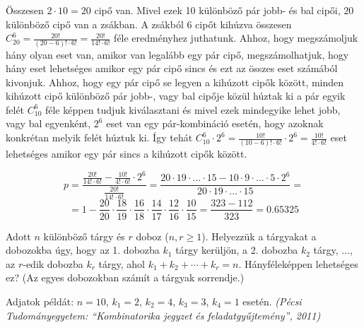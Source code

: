 \begin{solution}
Összesen $2\cdot10=20$ cipő van. Mivel ezek 10 különböző pár jobb-
és bal cipői, $20$ különböző cipő van a zsákban. A zsákból $6$ cipőt
kihúzva összesen $C_{20}^{6}=\frac{20!}{(20-6)!\cdot6!}=\frac{20!}{14!\cdot6!}$
féle eredményhez juthatunk. Ahhoz, hogy megszámoljuk hány olyan eset
van, amikor van legalább egy pár cipő, megszámolhatjuk, hogy hány
eset lehetséges amikor egy pár cipő sincs és ezt az összes eset számából
kivonjuk. Ahhoz, hogy egy pár cipő se legyen a kihúzott cipők között,
minden kihúzott cipő különböző pár jobb-, vagy bal cipője közül húztak
ki a pár egyik felét $C_{10}^{6}$ féle képpen tudjuk kiválasztani
és mivel ezek mindegyike lehet jobb, vagy bal egyenként, $2^{6}$
eset van egy pár-kombináció esetén, hogy azoknak konkrétan melyik
felét húztuk ki. Így tehát $C_{10}^{6}\cdot2^{6}=\frac{10!}{(10-6)!\cdot6!}\cdot2^{6}=\frac{10!}{4!\cdot6!}$
eset lehetséges amikor egy pár sincs a kihúzott cipők között.

\[
p=\frac{\frac{20!}{14!\cdot6!}-\frac{10!}{4!\cdot6!}\cdot2^{6}}{\frac{20!}{14!\cdot6!}}=\frac{20\cdot19\cdot...\cdot15-10\cdot9\cdot...\cdot5\cdot2^{6}}{20\cdot19\cdot...\cdot15}=
\]
\[
=1-\frac{20}{20}\cdot\frac{18}{19}\cdot\frac{16}{18}\cdot\frac{14}{17}\cdot\frac{12}{16}\cdot\frac{10}{15}=\frac{323-112}{323}=0.65325
\]
\end{solution}
\begin{extraproblem}
Adott $n$ különböző tárgy és $r$ doboz ($n,r\geq1$). Helyezzük
a tárgyakat a dobozokba úgy, hogy az 1. dobozba $k_{1}$ tárgy kerüljön,
a 2. dobozba $k_{2}$ tárgy, ..., az $r$-edik dobozba $k_{r}$ tárgy,
ahol $k_{1}+k_{2}+\cdots+k_{r}=n$. Hányféleképpen lehetséges ez?
(Az egyes dobozokban számít a tárgyak sorrendje.)
\end{extraproblem}
Adjatok példát: $n=10$, $k_{1}=2$, $k_{2}=4$, $k_{3}=3$, $k_{4}=1$
esetén.\emph{ (Pécsi Tudományegyetem: ``Kombinatorika jegyzet és
feladatgyűjtemény'', 2011)}
